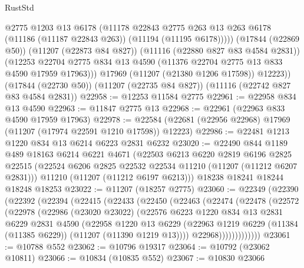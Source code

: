 \begin{lexlean}{RustStd}
\begin{coremodule}
              @2775
              @1203
              @13
              @6178
              (@11178
                @22843
                @2775
                @263
                @13
                @263
                @6178
                (@11186 (@11187 @22843 @263))
                (@11194 (@11195 @6178)))))
          (@17844 (@22869 @50))
          (@11207 (@22873 @84 @827))
          (@11116 (@22880 @827 @83 @4584 @2831))
          (@12253 @22704 @2775 @834 @13 @4590 (@11376 @22704 @2775 @13 @833 @4590 @17959 @17963)))
        @17969
        (@11207 (@21380 @1206 @17598))
        @12223))
    (@17844 (@22730 @50))
    (@11207 (@22735 @84 @827))
    (@11116 (@22742 @827 @83 @4584 @2831))
@22958 := @12253 @11584 @2775
@22961 := @22958 @834 @13 @4590
@22963 := @11847 @2775 @13
@22968 := @22961 (@22963 @833 @4590 @17959 @17963)
@22978 := @22584 (@22681 (@22956 @22968) @17969 (@11207 (@17974 @22591 @1210 @17598)) @12223)
@22986 := @22481 @1213 @1220 @834 @13 @6214 @6223 @2831 @6232
@23020 := @22490
    @844
    @1189
    @489
    @18163
    @6214
    @6221
    @4671
    (@22503
      @6213
      @6220
      @2819
      @6196
      @2825
      @22515
      (@22524 @6206 @2825 @22532 @22534 @11210 (@11207 (@11212 @6207 @2831)))
      @11210
      (@11207 (@11212 @6197 @6213)))
    @18238
    @18241
    @18244
    @18248
    @18253
@23022 := @11207 (@18257 @2775)
@23060 := @22349
    (@22390
      (@22392
        (@22394
          (@22415
            (@22433
              (@22450
                (@22463
                  (@22474
                    (@22478
                      (@22572
                        (@22978
                          (@22986
                            (@23020 @23022)
                            (@22576
                              @6223
                              @1220
                              @834
                              @13
                              @2831
                              @6229
                              @2831
                              @4590
                              (@22958
                                @1220
                                @13
                                @6229
                                (@22963
                                  @1219
                                  @6229
                                  (@11384 (@11385 @6229))
                                  (@11207 (@11390 @1219 @13))))
                              @22968)))))))))))))
@23061 := @10788 @552
@23062 := @10796 @19317
@23064 := @10792 (@23062 @10811)
@23066 := @10834 (@10835 @552)
@23067 := @10830 @23066

\end{coremodule}
\end{lexlean}
